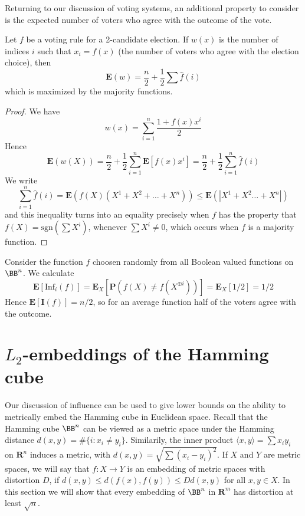 Returning to our discussion of voting systems, an additional property to consider is the expected number of voters who agree with the outcome of the vote.

\begin{theorem}
    Let $f$ be a voting rule for a 2-candidate election. If $w(x)$ is the number of indices $i$ such that $x_i = f(x)$ (the number of voters who agree with the election choice), then
    \[ \mathbf{E}(w) = \frac{n}{2} + \frac{1}{2} \sum \widehat{f}(i) \]
    which is maximized by the majority functions.
\end{theorem}
\begin{proof}
    We have
    \[ w(x) = \sum_{i = 1}^n \frac{1 + f(x) x^i}{2} \]
    Hence
    \[ \mathbf{E}(w(X)) = \frac{n}{2} + \frac{1}{2} \sum_{i = 1}^n \mathbf{E}[f(x)x^i] = \frac{n}{2} + \frac{1}{2} \sum_{i = 1}^n \widehat{f}(i) \]
    We write
    \[ \sum_{i = 1}^n \widehat{f}(i) = \mathbf{E}(f(X)(X^1 + X^2 + \dots + X^n)) \leq \mathbf{E}(|X^1 + X^2 \dots + X^n|) \]
    and this inequality turns into an equality precisely when $f$ has the property that $f(X) = \text{sgn}(\sum X^i)$, whenever $\sum X^i \neq 0$, which occurs when $f$ is a majority function.
\end{proof}

\begin{example}
    Consider the function $f$ choosen randomly from all Boolean valued functions on $\BB^n$. We calculate
    \[ \mathbf{E}[\text{Inf}_i(f)] = \mathbf{E}_X[\mathbf{P}(f(X) \neq f(X^{\oplus i}))] = \mathbf{E}_X[1/2] = 1/2 \]
    Hence $\mathbf{E}[\mathbf{I}(f)] = n/2$, so for an average function half of the voters agree with the outcome.
\end{example}

\section{$L_2$-embeddings of the Hamming cube}

Our discussion of influence can be used to give lower bounds on the ability to metrically embed the Hamming cube in Euclidean space. Recall that the Hamming cube $\BB^n$ can be viewed as a metric space under the Hamming distance $d(x,y) = \# \{ i: x_i \neq y_i \}$. Similarily, the inner product $\langle x, y \rangle = \sum x_i y_i$ on $\mathbf{R}^n$ induces a metric, with $d(x,y) = \sqrt{\sum (x_i - y_i)^2}$. If $X$ and $Y$ are metric spaces, we will say that $f: X \to Y$ is an embedding of metric spaces with distortion $D$, if $d(x,y) \leq d(f(x), f(y)) \leq D d(x,y)$ for all $x, y \in X$. In this section we will show that every embedding of $\BB^n$ in $\mathbf{R}^m$ has distortion at least $\sqrt{n}$.

